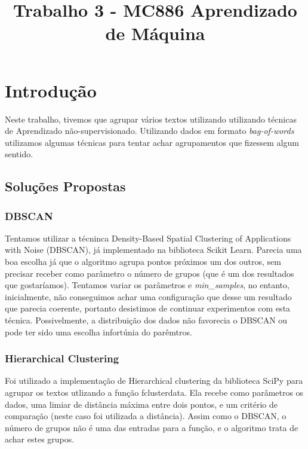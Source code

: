 \documentclass[conference]{IEEEtran}
\begin{document}
\title{Trabalho 3 - MC886 Aprendizado de Máquina}

\author{
\and
{}
}

\maketitle

\section{Introdução}

Neste trabalho, tivemos que agrupar vários textos utilizando utilizando técnicas de Aprendizado não-supervisionado. Utilizando dados em formato \textit{bag-of-words} utilizamos algumas técnicas para tentar achar agrupamentos que fizessem algum sentido.

\subsection{Soluções Propostas}

\subsubsection{DBSCAN}
Tentamos utilizar a técninca Density-Based Spatial Clustering of Applications with Noise (DBSCAN), já implementado na biblioteca Scikit Learn. Parecia uma boa escolha já que o algoritmo agrupa pontos próximos um dos outros, sem precisar receber como parâmetro o número de grupos (que é um dos resultados que gostaríamos). Tentamos variar os parâmetros  e \textit{min\_samples}, no entanto, inicialmente, não conseguimos achar uma configuração que desse um resultado que parecia coerente, portanto desistimos de continuar experimentos com esta técnica. Possivelmente, a distribuição dos dados não favorecia o DBSCAN ou pode ter sido uma escolha infortúnia do parêmtros.

\subsubsection{Hierarchical Clustering}
Foi utilizado a implementação de Hierarchical clustering da biblioteca SciPy para agrupar os textos utlizando a função fclusterdata. Ela recebe como parâmetros os dados, uma limiar de distância máxima entre dois pontos, e um critério de comparação (neste caso foi utilizada a distância). Assim como o DBSCAN, o número de grupos não é uma das entradas para a função, e o algoritmo trata de achar estes grupos.
\end{document}

